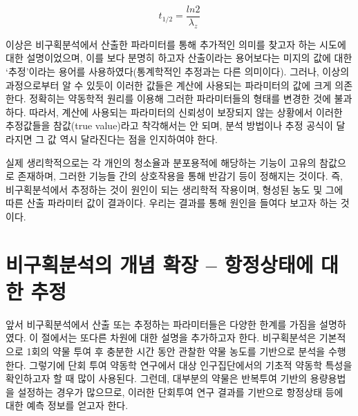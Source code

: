 \documentclass[
  11pt,
  krantz2, a4paper, twoside]{krantz}
\theoremstyle{definition}
\theoremstyle{definition}
\theoremstyle{definition}
\theoremstyle{definition}
\theoremstyle{remark}
\begin{document}
\begin{equation}
t_{1/2} = \frac{ln 2}{\lambda_{z}}
\label{eq:halflife}
\end{equation}

이상은 비구획분석에서 산출한 파라미터를 통해 추가적인 의미를 찾고자 하는 시도에 대한 설명이었으며, 이를 보다 분명히 하고자 산출이라는 용어보다는 미지의 값에 대한 `추정'이라는 용어를 사용하였다(통계학적인 추정과는 다른 의미이다).
그러나, 이상의 과정으로부터 알 수 있듯이 이러한 값들은 계산에 사용되는 파라미터의 값에 크게 의존한다.
정확히는 약동학적 원리를 이용해 그러한 파라미터들의 형태를 변경한 것에 불과하다.
따라서, 계산에 사용되는 파라미터의 신뢰성이 보장되지 않는 상황에서 이러한 추정값들을 참값(true value)라고 착각해서는 안 되며, 분석 방법이나 추정 공식이 달라지면 그 값 역시 달라진다는 점을 인지하여야 한다.

실제 생리학적으로는 각 개인의 청소율과 분포용적에 해당하는 기능이 고유의 참값으로 존재하며, 그러한 기능들 간의 상호작용을 통해 반감기 등이 정해지는 것이다.
즉, 비구획분석에서 추정하는 것이 원인이 되는 생리학적 작용이며, 형성된 농도 및 그에 따른 산출 파라미터 값이 결과이다.
우리는 결과를 통해 원인을 들여다 보고자 하는 것이다.

\hypertarget{uxbe44uxad6cuxd68duxbd84uxc11duxc758-uxac1cuxb150-uxd655uxc7a5-uxd56duxc815uxc0c1uxd0dcuxc5d0-uxb300uxd55c-uxcd94uxc815}{%
\section{비구획분석의 개념 확장 -- 항정상태에 대한 추정}\label{uxbe44uxad6cuxd68duxbd84uxc11duxc758-uxac1cuxb150-uxd655uxc7a5-uxd56duxc815uxc0c1uxd0dcuxc5d0-uxb300uxd55c-uxcd94uxc815}}

 

앞서 비구획분석에서 산출 또는 추정하는 파라미터들은 다양한 한계를 가짐을 설명하였다.
이 절에서는 또다른 차원에 대한 설명을 추가하고자 한다.
비구획분석은 기본적으로 1회의 약물 투여 후 충분한 시간 동안 관찰한 약물 농도를 기반으로 분석을 수행한다.
그렇기에 단회 투여 약동학 연구에서 대상 인구집단에서의 기초적 약동학 특성을 확인하고자 할 때 많이 사용된다.
그런데, 대부분의 약물은 반복투여 기반의 용량용법을 설정하는 경우가 많으므로, 이러한 단회투여 연구 결과를 기반으로 항정상태 등에 대한 예측 정보를 얻고자 한다.
\end{document}
